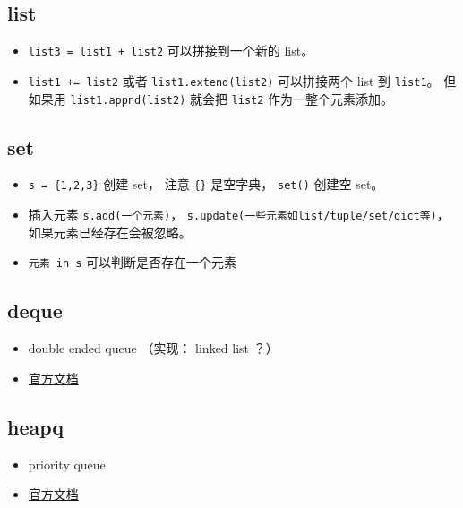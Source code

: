 
\begin{issues}
\issueDraft
\end{issues}

\subsection{list}
\begin{itemize}
\item \verb`list3 = list1 + list2` 可以拼接到一个新的 list。
\item \verb`list1 += list2` 或者 \verb`list1.extend(list2)` 可以拼接两个 list 到 \verb`list1`。 但如果用 \verb`list1.appnd(list2)` 就会把 \verb`list2` 作为一整个元素添加。
\end{itemize}

\subsection{set}
\begin{itemize}
\item \verb`s = {1,2,3}` 创建 set， 注意 \verb`{}` 是空字典， \verb`set()` 创建空 set。
\item 插入元素 \verb`s.add(一个元素)`， \verb`s.update(一些元素如list/tuple/set/dict等)`， 如果元素已经存在会被忽略。
\item \verb`元素 in s` 可以判断是否存在一个元素
\end{itemize}

\subsection{deque}
\begin{itemize}
\item double ended queue （实现： linked list ？）
\item \href{https://docs.python.org/3/library/collections.html}{官方文档}
\end{itemize}

\subsection{heapq}
\begin{itemize}
\item priority queue
\item \href{https://docs.python.org/3/library/heapq.html}{官方文档}
\end{itemize}

